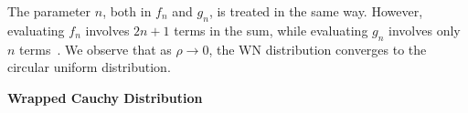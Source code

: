 \documentclass[remotesensing,article,submit,pdftex,moreauthors]{Definitions/mdpi}
\providecommand{\subsubsubsection}[1]{%
  \par\bigskip
  \noindent\textbf{#1}\par\nobreak\medskip
}
\begin{document}
The parameter $n$, both in $f_n$ and $g_n$, is treated in the same way.
However, evaluating $f_n$ involves $2n + 1$ terms in the sum, while evaluating $g_n$ involves only $n$ terms~\cite{EfficientEvaluationoftheProbabilityDensityFunctionofaWrappedNormalDistribution}. 
We observe that as $\rho\rightarrow0$, the WN distribution converges to the circular uniform distribution.

%
%

%
\subsubsubsection{Wrapped Cauchy Distribution}\label{sec:sec3.1.5_cap3}
\end{document}
